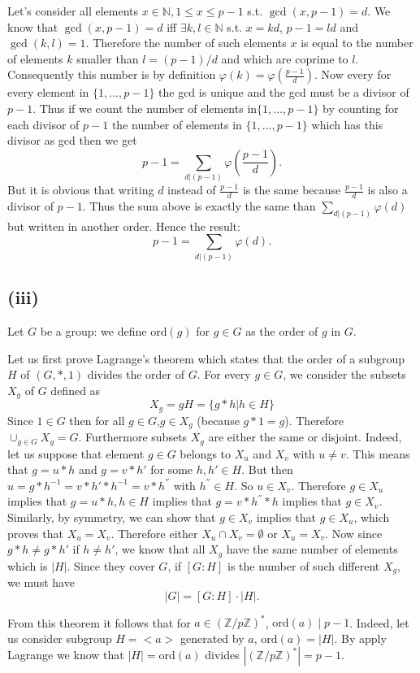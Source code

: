 \documentclass[12pt,a4paper]{article}
\newcommand {\zpz}[1]{\mathbb{Z}/#1\mathbb{Z}}
\newcommand {\ord}{\mathrm{ord}}
\begin{document}
Let's consider all elements $x\in \mathbb{N}, 1 \leq x \leq p-1$ s.t. $\gcd(x,p-1) = d$.
We know that $\gcd(x,p-1) = d$ iff $\exists k,l \in \mathbb{N}$ s.t. $x = kd$, $p-1 = ld$ and $\gcd(k,l) = 1$.
Therefore the number of such elements $x$ is equal to the number of elements $k$ smaller than $l = (p-1)/d$ and which are coprime to $l$. 
Consequently this number is by definition $\varphi(k) = \varphi(\frac { p-1} {d})$.
Now every for every element in $\{1,...,p-1\}$ the gcd is unique and the gcd must be a divisor of $p-1$. Thus 
if we count the number of elements in$\{1,...,p-1\}$ by counting for each divisor of $p-1$ the number of elements in $\{1,...,p-1\}$ which has this divisor as gcd then we get
\[
    p-1 = \sum_{d|(p-1)}{\varphi(\frac {p-1}{d})}.
\]
But it is obvious that writing $d$ instead of $\frac{p-1}{d}$ is the same because $\frac{p-1}{d}$ is also a divisor of $p-1$.
Thus the sum above is exactly the same than $\sum_{d|(p-1)}{\varphi(d)}$ but written in another order.
Hence the result:
\[
    p-1 = \sum_{d|(p-1)}{\varphi(d)}.
\]


\subsection*{(iii)}
Let $G$ be a group: we define $\ord(g)$ for $g\in G$ as the order of $g$ in $G$.

Let us first prove Lagrange's theorem which states that the order of a subgroup $H$ of $(G,*,1)$  divides the order of $G$.
For every $g \in G$, we consider the subsets $X_g$ of $G$ defined as
\[
    X_g = gH = \{g*h | h \in H\}
\]
Since $1 \in G$ then for all $g\in G$,$g \in X_g$ (because $g*1 = g$). Therefore $\cup_{g\in G} X_g = G$.
Furthermore subsets $X_g$ are either the same or disjoint. Indeed, let us suppose that element $g\in G$ belongs to $X_u$ and $X_v$ with $u\neq v$.
This means that $g = u*h$ and $g = v*h'$ for some $h,h'\in H$. But then $u = g*h^{-1} = v*h'*h^{-1} = v*h^{''}$ with $h^{''} \in H$. So $u \in X_v$.
Therefore $g\in X_u$ implies that $g = u*h, h\in H$ implies that $g = v*h^{''}*h$ implies that $g\in X_v$.
Similarly, by symmetry, we can show that $g\in X_v$ implies that $g\in X_u$, which proves that $X_u = X_v$.
Therefore either $X_u \cap X_v = \emptyset$ or $X_u = X_v$.
Now since $g*h \neq g*h'$ if $h\neq h'$, we know that all $X_g$ have the same number of elements which is $|H|$.
Since they cover $G$, if $[G:H]$ is the number of such different $X_g$, we must have
\[
    |G| = [G:H] \cdot |H|.
\]

From this theorem it follows that for $a\in (\zpz p)^*$, $\ord(a) \mid p-1$. Indeed, let us consider subgroup $H = <a>$ generated by $a$, $\ord(a) = |H|$.
By apply Lagrange we know that $|H| = \ord(a)$ divides $|(\zpz p)^*| = p-1$.
\end{document}
